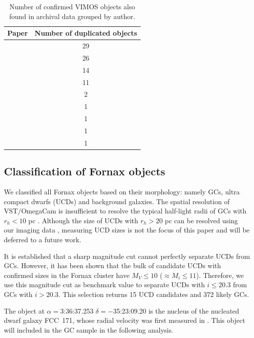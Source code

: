 \documentclass[useAMS,usenatbib]{mn2e}
\newcommand{\kms}{\mbox{\,km~s$^{-1}$}}
\begin{document}
\begin{table}
\centering
\label{mathmode}
\begin{tabular}{@{}l c}
\hline
Paper & Number of duplicated objects \\
\hline
\citet{Dirsch04}       &  29 \\
\citet{Schuberth}      &  26 \\
\citet{Bergond07}      &  14 \\
\citet{Firth07}        &  11 \\
\citet{Chilingarian11} &  2  \\
\citet{Mieske04}       &  1  \\
\citet{Hilker07}       &  1  \\
\citet{Francis12}      &  1  \\
\citet{Drinkwater00}   &  1  \\
\hline
\end{tabular}
\caption{Number of confirmed VIMOS objects also found in archival data grouped 
by author.}
\label{tab:authors} 
\end{table}

\subsection{Classification of Fornax objects}

We classified all Fornax objects based on their morphology: namely GCs, ultra 
compact dwarfs (UCDs) and background galaxies. The spatial resolution of 
VST/OmegaCam is insufficient to resolve the typical half-light radii of GCs 
with $r_h < 10$ pc \citep{Masters, Puzia14}. Although the size of UCDs with 
$r_h > 20$ pc can be resolved using our imaging data \citep{Cantiello15}, 
measuring UCD sizes is not the focus of this paper and will be deferred to a 
future work.

It is established that a sharp magnitude cut cannot perfectly separate UCDs 
from GCs. However, it has been shown \citep{Voggel16, 
Eigenthaler18} that the bulk of candidate UCDs with confirmed sizes in the Fornax cluster 
have $M_V \le 10$ ($\approx M_i \le 11$). 
Therefore, we use this magnitude cut as benchmark value to separate UCDs with 
$i \le 20.3$ from GCs with $i > 20.3$. This selection returns 15 UCD candidates 
and 372 likely GCs. 

The object at $\alpha=$3:36:37.253 $\delta=-$35:23:09.20 is the nucleus of the 
nucleated dwarf galaxy FCC~171, whose radial velocity was first measured in 
\citet{Bergond07}. This object will included in the GC sample in the following 
analysis.  
\end{document}

